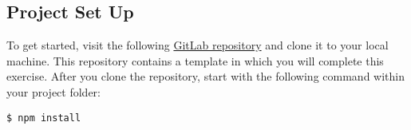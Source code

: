 \documentclass[12pt]{article}
\begin{document}
\subsection*{Project Set Up}

To get started, visit the following \href{https://gitlab.fel.cvut.cz/radovluk/smart-contracts-exercises/-/tree/main/05-Reentrancy/task/task-code}{GitLab repository} and clone it to your local machine. This repository contains a template in which you will complete this exercise. After you clone the repository, start with the following command within your project folder:

\begin{verbatim}
$ npm install
\end{verbatim}
\end{document}
